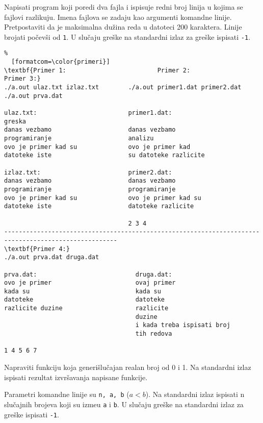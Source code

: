\documentclass{article}
\def\d{{\fontencoding{T1}\selectfont\dj}}
\begin{document}
\begin{z}
Napisati program koji poredi dva fajla i ispisuje redni broj linija u
kojima se fajlovi razlikuju.  Imena fajlova se zadaju kao argumenti
komandne linije.  Pretpostaviti da je maksimalna du\v zina
reda u datoteci 200 karaktera.  Linije brojati počevši od {\tt 1}. U slučaju greške na standardni izlaz za greške ispisati {\tt -1}. 
\end{z}
\begin{Verbatim}%
  [formatcom=\color{primeri}]
\textbf{Primer 1:                         Primer 2:                               Primer 3:}                    
./a.out ulaz.txt izlaz.txt        ./a.out primer1.dat primer2.dat         ./a.out prva.dat

ulaz.txt:                         primer1.dat:                            greska
danas vezbamo                     danas vezbamo 
programiranje                     analizu
ovo je primer kad su              ovo je primer kad
datoteke iste                     su datoteke razlicite

izlaz.txt:                        primer2.dat:
danas vezbamo                     danas vezbamo
programiranje                     programiranje
ovo je primer kad su              ovo je primer kad su
datoteke iste                     datoteke razlicite
                                  
                                  2 3 4
-----------------------------------------------------------------------------------------------------
\textbf{Primer 4:}
./a.out prva.dat druga.dat

prva.dat:                           druga.dat:
ovo je primer                       ovaj primer
kada su                             kada su        
datoteke                            datoteke
razlicite duzine                    razlicite
                                    duzine
                                    i kada treba ispisati broj
                                    tih redova

1 4 5 6 7
\end{Verbatim}

\begin{z}
Napraviti funkciju koja generi\v slu\v cajan realan broj od 0 i 1. Na standardni izlaz ispisati rezultat izvršavanja napisane funkcije.
\end{z}

\begin{z}
Parametri komandne linije su {\tt n, a, b} ($a < b$). Na standardni izlaz ispisati n slučajnih brojeva koji
su izme\d u {\tt a} i {\tt b}. U slučaju greške na standardni izlaz za greške ispisati {\tt -1}. 
\end{z}
\end{document}
